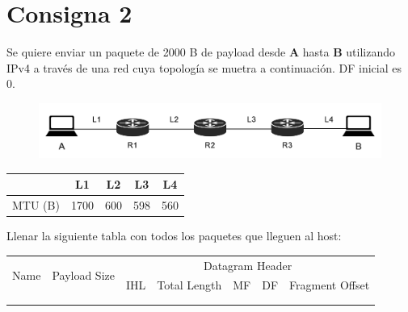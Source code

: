 \section*{Consigna 2}

Se quiere enviar un paquete de 2000 B de payload desde \textbf{A} hasta \textbf{B} utilizando IPv4 a través de una red cuya topología se muetra a continuación. DF inicial es 0.

\begin{figure}[H]
    \centering
    \includegraphics[width=0.9\linewidth]{Images/topologia.png}
\end{figure}

\vspace{-5mm}
{
\renewcommand{\arraystretch}{1.5}
\begin{table}[H]
    \centering
    \begin{tabular}{|c|c|c|c|c|}
    \hline
     & L1 & L2 & L3 & L4 \\ \hline
    MTU (B) & 1700 & 600 & 598 & 560\\ \hline
    \end{tabular}
\end{table}
}


Llenar la siguiente tabla con todos los paquetes que lleguen al host:

\begin{table}[H]
    \centering
    \renewcommand{\arraystretch}{1.5}
    \begin{tabular}{|c|c|crrrr|}
    \hline
    \multirow{2}{*}{Name} & \multirow{2}{*}{Payload Size} & \multicolumn{5}{c|}{Datagram Header} \\ \cline{3-7} 
     &  & \multicolumn{1}{c|}{IHL} & \multicolumn{1}{c|}{Total Length} &  \multicolumn{1}{c|}{MF} & \multicolumn{1}{c|}{DF} & \multicolumn{1}{c|}{Fragment Offset} \\ \hline
    \multicolumn{1}{|r|}{} & \multicolumn{1}{r|}{} & \multicolumn{1}{r|}{} & \multicolumn{1}{r|}{} & \multicolumn{1}{r|}{} & \multicolumn{1}{r|}{} &  \\ \hline
    \multicolumn{1}{|r|}{} & \multicolumn{1}{r|}{} & \multicolumn{1}{r|}{} & \multicolumn{1}{r|}{} & \multicolumn{1}{r|}{} & \multicolumn{1}{r|}{} &  \\ \hline
    \end{tabular}
\end{table}
